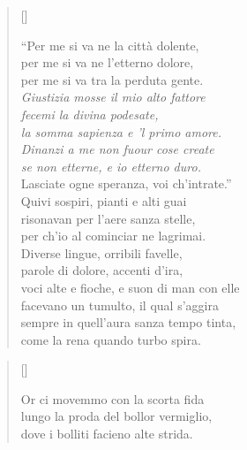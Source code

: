 \documentclass{article}
\begin{document}
\begin{verse}[\versewidth]
  \begin{patverse*}
    ``Per me si va ne la città dolente,\\
    per me si va ne l'etterno dolore,\\
    per me si va tra la perduta gente.\\
    \emph{Giustizia mosse il mio alto fattore\\
    fecemi la divina podesate,\\
    la somma sapienza e 'l primo amore.\\
    Dinanzi a me non fuour cose create\\
    se non etterne, e io etterno duro.}\\
    Lasciate ogne speranza, voi ch'intrate.''\\[10pt]
    Quivi sospiri, pianti e alti guai\\
    risonavan per l'aere sanza stelle,\\
    per ch'io al cominciar ne lagrimai.\\
    Diverse lingue, orribili favelle,\\
    parole di dolore, accenti d'ira,\\
    voci alte e fioche, e suon di man con elle\\
    facevano un tumulto, il qual s'aggira\\
    sempre in quell'aura sanza tempo tinta,\\
    come la rena quando turbo spira.
  \end{patverse*}
\end{verse}

\begin{verse}[\versewidth]
  \begin{patverse*}
    Or ci movemmo con la scorta fida\\
    lungo la proda del bollor vermiglio,\\
    dove i bolliti facieno alte strida.
  \end{patverse*}
\end{verse}
\end{document}
